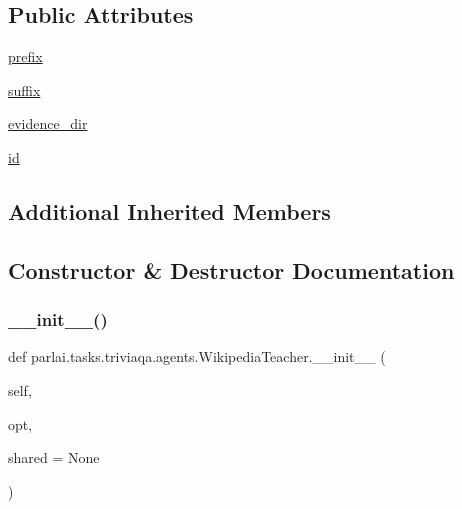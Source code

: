 \subsection*{Public Attributes}
\begin{DoxyCompactItemize}
\item 
\hyperlink{classparlai_1_1tasks_1_1triviaqa_1_1agents_1_1WikipediaTeacher_a5b37aa1d9fc169e9daeb33ebcaa1f259}{prefix}
\item 
\hyperlink{classparlai_1_1tasks_1_1triviaqa_1_1agents_1_1WikipediaTeacher_aff5be8d4af8ead80a67963cdfe9a7f08}{suffix}
\item 
\hyperlink{classparlai_1_1tasks_1_1triviaqa_1_1agents_1_1WikipediaTeacher_ae361f0f221fa8d8aa814d68dfcd30e25}{evidence\+\_\+dir}
\item 
\hyperlink{classparlai_1_1tasks_1_1triviaqa_1_1agents_1_1WikipediaTeacher_af8a1bc2da82beacd3b734238d8e2f955}{id}
\end{DoxyCompactItemize}
\subsection*{Additional Inherited Members}


\subsection{Constructor \& Destructor Documentation}
\mbox{\label{classparlai_1_1tasks_1_1triviaqa_1_1agents_1_1WikipediaTeacher_a8f98e896d67718624f8304ad03a08def}} 
\subsubsection{\texorpdfstring{\+\_\+\+\_\+init\+\_\+\+\_\+()}{\_\_init\_\_()}}
{\footnotesize\ttfamily def parlai.\+tasks.\+triviaqa.\+agents.\+Wikipedia\+Teacher.\+\_\+\+\_\+init\+\_\+\+\_\+ (\begin{DoxyParamCaption}\item[{}]{self,  }\item[{}]{opt,  }\item[{}]{shared = {\ttfamily None} }\end{DoxyParamCaption})}



